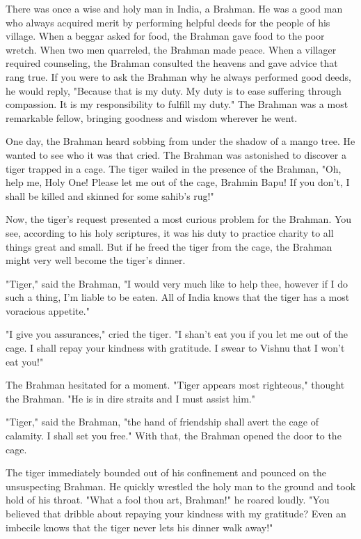 There was once a wise and holy man in India, a Brahman. He was a good man who always acquired merit by performing helpful deeds for the people of his village. When a beggar asked for food, the Brahman gave food to the poor wretch. When two men quarreled, the Brahman made peace. When a villager required counseling, the Brahman consulted the heavens and gave advice that rang true. If you were to ask the Brahman why he always performed good deeds, he would reply, "Because that is my duty. My duty is to ease suffering through compassion. It is my responsibility to fulfill my duty." The Brahman was a most remarkable fellow, bringing goodness and wisdom wherever he went.

One day, the Brahman heard sobbing from under the shadow of a mango tree. He wanted to see who it was that cried. The Brahman was astonished to discover a tiger trapped in a cage. The tiger wailed in the presence of the Brahman, "Oh, help me, Holy One! Please let me out of the cage, Brahmin Bapu! If you don't, I shall be killed and skinned for some sahib's rug!"

Now, the tiger's request presented a most curious problem for the Brahman. You see, according to his holy scriptures, it was his duty to practice charity to all things great and small. But if he freed the tiger from the cage, the Brahman might very well become the tiger's dinner.

"Tiger," said the Brahman, "I would very much like to help thee, however if I do such a thing, I'm liable to be eaten. All of India knows that the tiger has a most voracious appetite."

"I give you assurances," cried the tiger. "I shan't eat you if you let me out of the cage. I shall repay your kindness with gratitude. I swear to Vishnu that I won't eat you!"

The Brahman hesitated for a moment. "Tiger appears most righteous," thought the Brahman. "He is in dire straits and I must assist him."

"Tiger," said the Brahman, "the hand of friendship shall avert the cage of calamity. I shall set you free." With that, the Brahman opened the door to the cage.

The tiger immediately bounded out of his confinement and pounced on the unsuspecting Brahman. He quickly wrestled the holy man to the ground and took hold of his throat. "What a fool thou art, Brahman!" he roared loudly. "You believed that dribble about repaying your kindness with my gratitude? Even an imbecile knows that the tiger never lets his dinner walk away!"

